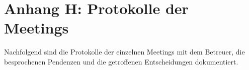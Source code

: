\chapter{Anhang H: Protokolle der Meetings}
Nachfolgend sind die Protokolle der einzelnen Meetings mit dem Betreuer, 
die besprochenen Pendenzen und die getroffenen Entscheidungen dokumentiert.
\label{meetings}
\clearpage









